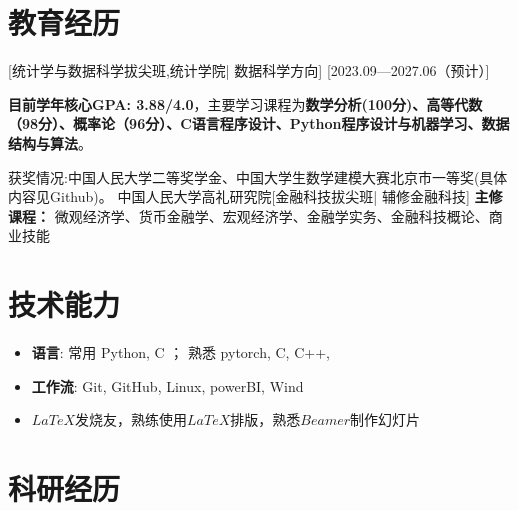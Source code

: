 \documentclass{resume}
\begin{document}


\ResumeTitle


\section{教育经历}
[\textnormal{统计学与数据科学拔尖班,统计学院|} 数据科学方向]
[2023.09—2027.06（预计）]

\textbf{目前学年核心GPA: 3.88/4.0}，主要学习课程为\textbf{数学分析(100分)、高等代数（98分）、概率论（96分）、C语言程序设计、Python程序设计与机器学习、数据结构与算法}。

获奖情况:中国人民大学二等奖学金、中国大学生数学建模大赛北京市一等奖(具体内容见Github)。
\ResumeItem
{中国人民大学高礼研究院}[\textnormal{金融科技拔尖班|} 辅修金融科技]
\textbf{主修课程：} 微观经济学、货币金融学、宏观经济学、金融学实务、金融科技概论、商业技能

\section[技术能力]{技术能力\protect}
\begin{itemize}
  \item \textbf{语言}: 常用 Python, C ； 熟悉 pytorch, C, C++, 
  \item \textbf{工作流}: Git, GitHub, Linux, powerBI, Wind
  \item $LaTeX$发烧友，熟练使用$LaTeX$排版，熟悉$Beamer$制作幻灯片
\end{itemize}

\section{科研经历}
\end{document}

